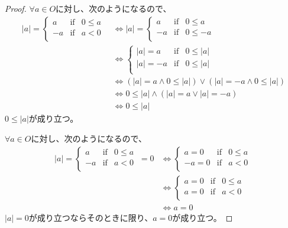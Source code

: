 \documentclass[dvipdfmx]{jsarticle}
\begin{document}
\begin{proof}
$\forall a \in O$に対し、次のようになるので、
\begin{align*}
|a| = \left\{ \begin{matrix}
a & \mathrm{if} & 0 \leq a \\
 - a & \mathrm{if} & a < 0 \\
\end{matrix} \right.\  &\Leftrightarrow |a| = \left\{ \begin{matrix}
a & \mathrm{if} & 0 \leq a \\
 - a & \mathrm{if} & 0 \leq - a \\
\end{matrix} \right.\ \\ 
&\Leftrightarrow \left\{ \begin{matrix}
|a| = a & \mathrm{if} & 0 \leq |a| \\
|a| = - a & \mathrm{if} & 0 \leq |a| \\
\end{matrix} \right.\ \\ 
&\Leftrightarrow \left( |a| = a \land 0 \leq |a| \right) \vee \left( |a| = - a \land 0 \leq |a| \right)\\ 
&\Leftrightarrow 0 \leq |a| \land \left( |a| = a \vee |a| = - a \right)\\ 
&\Leftrightarrow 0 \leq |a|
\end{align*}
$0 \leq |a|$が成り立つ。\par
$\forall a \in O$に対し、次のようになるので、
\begin{align*}
|a| = \left\{ \begin{matrix}
a & \mathrm{if} & 0 \leq a \\
 - a & \mathrm{if} & a < 0 \\
\end{matrix} \right.\  = 0 &\Leftrightarrow \left\{ \begin{matrix}
a = 0 & \mathrm{if} & 0 \leq a \\
 - a = 0 & \mathrm{if} & a < 0 \\
\end{matrix} \right.\ \\ 
&\Leftrightarrow \left\{ \begin{matrix}
a = 0 & \mathrm{if} & 0 \leq a \\
a = 0 & \mathrm{if} & a < 0 \\
\end{matrix} \right.\ \\ 
&\Leftrightarrow a = 0
\end{align*}
$|a| = 0$が成り立つならそのときに限り、$a = 0$が成り立つ。\par

\end{proof}
\end{document}
